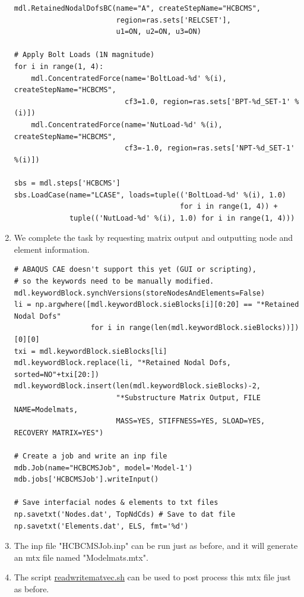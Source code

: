 \documentclass[11pt]{article}
\begin{document}
\begin{enumerate}
\begin{verbatim}
mdl.RetainedNodalDofsBC(name="A", createStepName="HCBCMS",
                        region=ras.sets['RELCSET'],
                        u1=ON, u2=ON, u3=ON)

# Apply Bolt Loads (1N magnitude)
for i in range(1, 4):
    mdl.ConcentratedForce(name='BoltLoad-%d' %(i), createStepName="HCBCMS",
                          cf3=1.0, region=ras.sets['BPT-%d_SET-1' %(i)])
    mdl.ConcentratedForce(name='NutLoad-%d' %(i), createStepName="HCBCMS",
                          cf3=-1.0, region=ras.sets['NPT-%d_SET-1' %(i)])

sbs = mdl.steps['HCBCMS']
sbs.LoadCase(name="LCASE", loads=tuple(('BoltLoad-%d' %(i), 1.0)
                                       for i in range(1, 4)) +
             tuple(('NutLoad-%d' %(i), 1.0) for i in range(1, 4)))
\end{verbatim}
\item We complete the task by requesting matrix output and outputting node and element information.
\begin{verbatim}
# ABAQUS CAE doesn't support this yet (GUI or scripting),
# so the keywords need to be manually modified.
mdl.keywordBlock.synchVersions(storeNodesAndElements=False)
li = np.argwhere([mdl.keywordBlock.sieBlocks[i][0:20] == "*Retained Nodal Dofs"
                  for i in range(len(mdl.keywordBlock.sieBlocks))])[0][0]
txi = mdl.keywordBlock.sieBlocks[li]
mdl.keywordBlock.replace(li, "*Retained Nodal Dofs, sorted=NO"+txi[20:])
mdl.keywordBlock.insert(len(mdl.keywordBlock.sieBlocks)-2, 
                        "*Substructure Matrix Output, FILE NAME=Modelmats,
                        MASS=YES, STIFFNESS=YES, SLOAD=YES, RECOVERY MATRIX=YES")

# Create a job and write an inp file
mdb.Job(name="HCBCMSJob", model='Model-1')
mdb.jobs['HCBCMSJob'].writeInput()

# Save interfacial nodes & elements to txt files
np.savetxt('Nodes.dat', TopNdCds) # Save to dat file
np.savetxt('Elements.dat', ELS, fmt='%d')
\end{verbatim}
\item The inp file "HCBCMSJob.inp" can be run just as before, and it will generate an mtx file named "Modelmats.mtx".
\item The script \href{https://github.com/Nidish96/Abaqus4Joints/blob/main/scripts/readwritematvec.sh}{readwritematvec.sh} can be used to post process this mtx file just as before.
\end{enumerate}
\end{document}
